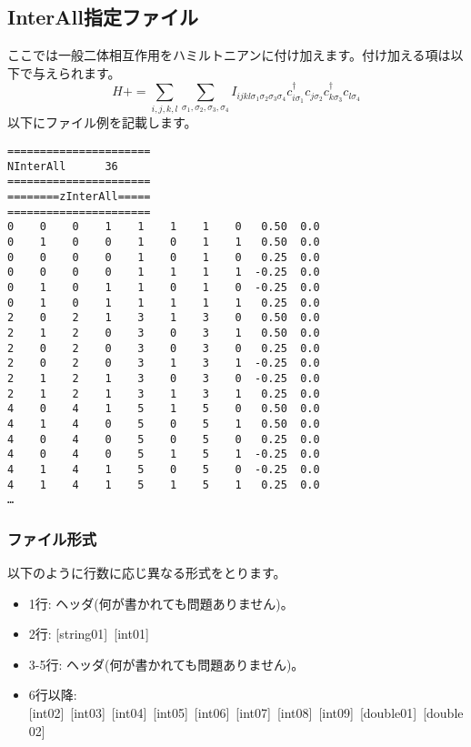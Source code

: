 \newpage
\subsection{InterAll指定ファイル}
\label{Subsec:interall}
ここでは一般二体相互作用をハミルトニアンに付け加えます。付け加える項は以下で与えられます。
\begin{equation}
H+=\sum_{i,j,k,l}\sum_{\sigma_1,\sigma_2, \sigma_3, \sigma_4}
I_{ijkl\sigma_1\sigma_2\sigma_3\sigma_4}c_{i\sigma_1}^{\dagger}c_{j\sigma_2}c_{k\sigma_3}^{\dagger}c_{l\sigma_4}
\end{equation}
以下にファイル例を記載します。

\begin{minipage}{12.5cm}
\begin{screen}
\begin{verbatim}
====================== 
NInterAll      36  
====================== 
========zInterAll===== 
====================== 
0    0    0    1    1    1    1    0   0.50  0.0
0    1    0    0    1    0    1    1   0.50  0.0
0    0    0    0    1    0    1    0   0.25  0.0
0    0    0    0    1    1    1    1  -0.25  0.0
0    1    0    1    1    0    1    0  -0.25  0.0
0    1    0    1    1    1    1    1   0.25  0.0
2    0    2    1    3    1    3    0   0.50  0.0
2    1    2    0    3    0    3    1   0.50  0.0
2    0    2    0    3    0    3    0   0.25  0.0
2    0    2    0    3    1    3    1  -0.25  0.0
2    1    2    1    3    0    3    0  -0.25  0.0
2    1    2    1    3    1    3    1   0.25  0.0
4    0    4    1    5    1    5    0   0.50  0.0
4    1    4    0    5    0    5    1   0.50  0.0
4    0    4    0    5    0    5    0   0.25  0.0
4    0    4    0    5    1    5    1  -0.25  0.0
4    1    4    1    5    0    5    0  -0.25  0.0
4    1    4    1    5    1    5    1   0.25  0.0
…
\end{verbatim}
\end{screen}
\end{minipage}

\subsubsection{ファイル形式}
以下のように行数に応じ異なる形式をとります。
 \begin{itemize}
   \item  1行:  ヘッダ(何が書かれても問題ありません)。
   \item  2行:   [string01]~[int01]
   \item  3-5行:  ヘッダ(何が書かれても問題ありません)。
   \item  6行以降:
   [int02]~[int03]~[int04]~[int05]~[int06]~[int07]~[int08]~[int09]~[double01]~[double02] 
  \end{itemize}
